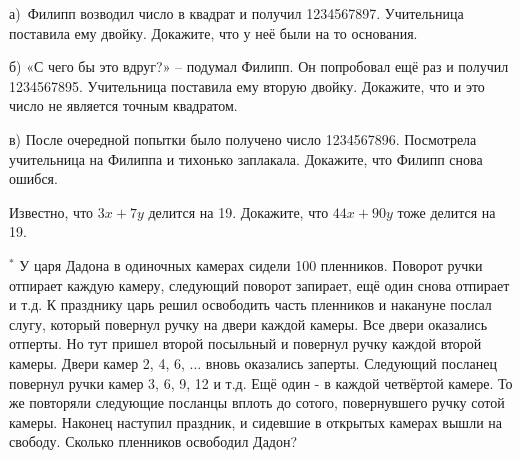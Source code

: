
\begin{thm}
    а)~Филипп возводил число в квадрат и получил 1234567897. Учительница поставила ему двойку. Докажите, что у неё были на то основания. 
\par
    б) «С чего бы это вдруг?» – подумал Филипп. Он попробовал ещё раз и получил 1234567895. Учительница поставила ему вторую двойку. Докажите, что и это число не является точным квадратом. 
\par
    в) После очередной попытки было получено число 1234567896. Посмотрела учительница на Филиппа и тихонько заплакала. Докажите, что Филипп снова ошибся.
\end{thm}

\begin{thm}
    Известно, что $3x+7y$ делится на 19. Докажите, что $44x+90y$ тоже делится на 19.
\end{thm}

\begin{thm} $^{\ast}$ 
    У царя Дадона в одиночных камерах сидели 100 пленников. Поворот ручки отпирает каждую камеру, следующий поворот запирает, ещё один снова отпирает и т.д. К празднику царь решил освободить часть пленников и накануне послал слугу, который повернул ручку на двери каждой камеры. Все двери оказались отперты. Но тут пришел второй посыльный и повернул ручку каждой второй камеры. Двери камер 2, 4, 6, ... вновь оказались заперты. Следующий посланец повернул ручки камер 3, 6, 9, 12 и т.д. Ещё один - в каждой четвёртой камере. То же повторяли следующие посланцы вплоть до сотого, повернувшего ручку сотой камеры. Наконец наступил праздник, и сидевшие в открытых камерах вышли на свободу. Сколько пленников освободил Дадон?
\end{thm}

